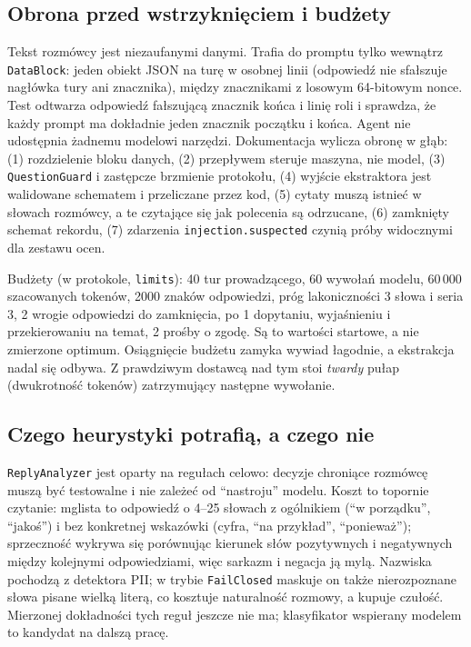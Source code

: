 \subsection{Obrona przed wstrzyknięciem i budżety}

Tekst rozmówcy jest niezaufanymi danymi. Trafia do promptu tylko wewnątrz
\texttt{DataBlock}: jeden obiekt JSON na turę w osobnej linii (odpowiedź nie
sfałszuje nagłówka tury ani znacznika), między znacznikami z losowym 64-bitowym
nonce. Test odtwarza odpowiedź fałszującą znacznik końca i linię roli i sprawdza,
że każdy prompt ma dokładnie jeden znacznik początku i końca. Agent nie
udostępnia żadnemu modelowi narzędzi. Dokumentacja wylicza obronę w głąb:
(1) rozdzielenie bloku danych, (2) przepływem steruje maszyna, nie model,
(3) \texttt{QuestionGuard} i zastępcze brzmienie protokołu, (4) wyjście
ekstraktora jest walidowane schematem i przeliczane przez kod, (5) cytaty muszą
istnieć w słowach rozmówcy, a te czytające się jak polecenia są odrzucane,
(6) zamknięty schemat rekordu, (7) zdarzenia \texttt{injection.suspected}
czynią próby widocznymi dla zestawu ocen.


Budżety (w protokole, \texttt{limits}): 40 tur prowadzącego, 60 wywołań modelu,
60\,000 szacowanych tokenów, 2000 znaków odpowiedzi, próg lakoniczności
3 słowa i seria 3, 2 wrogie odpowiedzi do zamknięcia, po 1 dopytaniu,
wyjaśnieniu i przekierowaniu na temat, 2 prośby o zgodę. Są to wartości
startowe, a nie zmierzone optimum. Osiągnięcie budżetu zamyka wywiad
łagodnie, a ekstrakcja nadal się odbywa. Z prawdziwym dostawcą nad tym stoi
\emph{twardy} pułap (dwukrotność tokenów) zatrzymujący następne wywołanie.

\subsection{Czego heurystyki potrafią, a czego nie}

\texttt{ReplyAnalyzer} jest oparty na regułach celowo: decyzje chroniące
rozmówcę muszą być testowalne i nie zależeć od ``nastroju'' modelu. Koszt to
topornie czytanie: mglista to odpowiedź o 4--25 słowach z ogólnikiem
(``w porządku'', ``jakoś'') i bez konkretnej wskazówki (cyfra, ``na przykład'',
``ponieważ''); sprzeczność wykrywa się porównując kierunek słów pozytywnych
i negatywnych między kolejnymi odpowiedziami, więc sarkazm i negacja ją mylą.
Nazwiska pochodzą z detektora PII; w trybie \texttt{FailClosed} maskuje on
także nierozpoznane słowa pisane wielką literą, co kosztuje naturalność
rozmowy, a kupuje czułość. Mierzonej dokładności tych reguł jeszcze nie ma;
klasyfikator wspierany modelem to kandydat na dalszą pracę.


